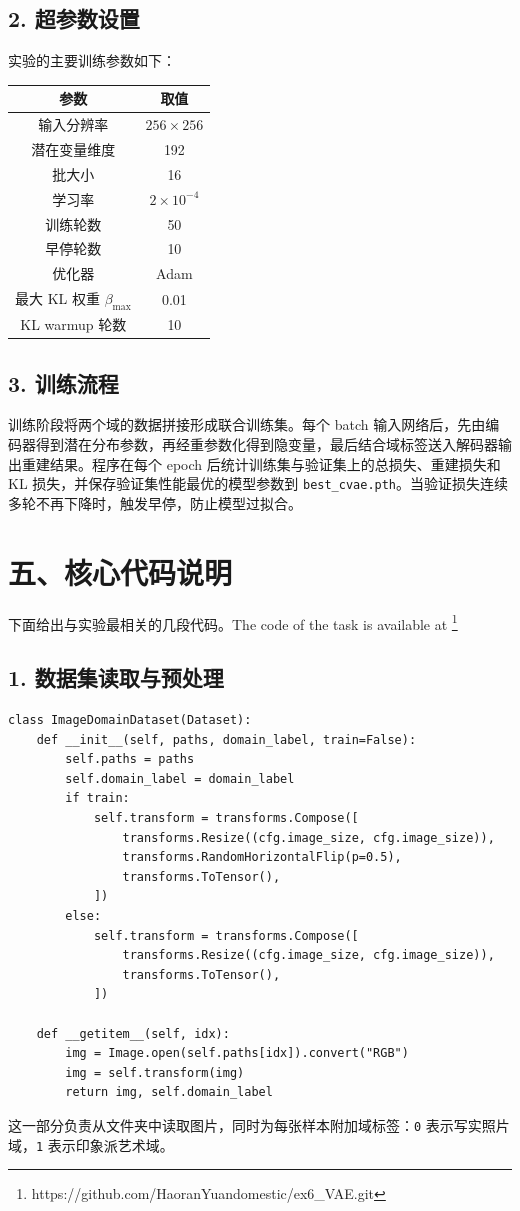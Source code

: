\documentclass[12pt,a4paper]{ctexart}
\begin{document}
\subsection*{2. 超参数设置}
实验的主要训练参数如下：
\begin{center}
\begin{tabular}{cc}
\toprule
参数 & 取值 \\
\midrule
输入分辨率 & $256\times256$ \\
潜在变量维度 & 192 \\
批大小 & 16 \\
学习率 & $2\times10^{-4}$ \\
训练轮数 & 50 \\
早停轮数 & 10 \\
优化器 & Adam \\
最大 KL 权重 $\beta_{\max}$ & 0.01 \\
KL warmup 轮数 & 10 \\
\bottomrule
\end{tabular}
\end{center}

\subsection*{3. 训练流程}
训练阶段将两个域的数据拼接形成联合训练集。每个 batch 输入网络后，先由编码器得到潜在分布参数，再经重参数化得到隐变量，最后结合域标签送入解码器输出重建结果。程序在每个 epoch 后统计训练集与验证集上的总损失、重建损失和 KL 损失，并保存验证集性能最优的模型参数到 \texttt{best\_cvae.pth}。当验证损失连续多轮不再下降时，触发早停，防止模型过拟合。

\section*{五、核心代码说明}
下面给出与实验最相关的几段代码。The code of the task is available at \footnote{https://github.com/HaoranYuandomestic/ex6\_VAE.git}

\subsection*{1. 数据集读取与预处理}
\begin{lstlisting}
class ImageDomainDataset(Dataset):
    def __init__(self, paths, domain_label, train=False):
        self.paths = paths
        self.domain_label = domain_label
        if train:
            self.transform = transforms.Compose([
                transforms.Resize((cfg.image_size, cfg.image_size)),
                transforms.RandomHorizontalFlip(p=0.5),
                transforms.ToTensor(),
            ])
        else:
            self.transform = transforms.Compose([
                transforms.Resize((cfg.image_size, cfg.image_size)),
                transforms.ToTensor(),
            ])

    def __getitem__(self, idx):
        img = Image.open(self.paths[idx]).convert("RGB")
        img = self.transform(img)
        return img, self.domain_label
\end{lstlisting}
这一部分负责从文件夹中读取图片，同时为每张样本附加域标签：\texttt{0} 表示写实照片域，\texttt{1} 表示印象派艺术域。
\end{document}
